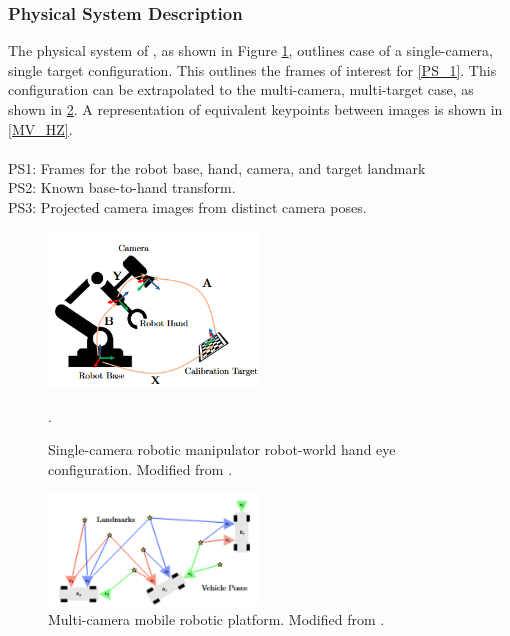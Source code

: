 \documentclass[12pt]{article}
\begin{document}
\subsubsection{Physical System Description} \label{sec_phySystDescrip}
The physical system of \progname{}, as shown in Figure \ref{Wang_EOH}, outlines 
case of a single-camera, single target configuration. This outlines the frames of 
interest for \ref{PS_1}. This configuration can be extrapolated to the multi-camera, 
multi-target case, as shown in \ref{OASIS}. A representation of equivalent keypoints 
between images is shown in \ref{MV_HZ}.
\\
\\
\noindent\label{PS_1}PS1: Frames for the robot base, hand, camera, and target landmark\\
\noindent\label{PS_2}PS2: Known base-to-hand transform.\\
\noindent\label{PS_3}PS3: Projected camera images from distinct camera poses.

\begin{figure}[h!]
  \begin{center}
  \centering\includegraphics[width=0.5\textwidth]{Images/Wang_EOH.png}
  \caption{Single-camera robotic manipulator robot-world hand eye 
  configuration. Modified from \cite{Wang_2022}.}.
  \label{Wang_EOH}
  \end{center}
\end{figure}

\begin{figure}[ht!]
  \begin{center}
  \centering\includegraphics[width=0.5\textwidth]{Images/OASIS_RevVar.png}
  \caption{Multi-camera mobile robotic platform. 
  Modified from \cite{OASIS_2024}.}
  \label{OASIS}
  \end{center}
\end{figure}
\end{document}
